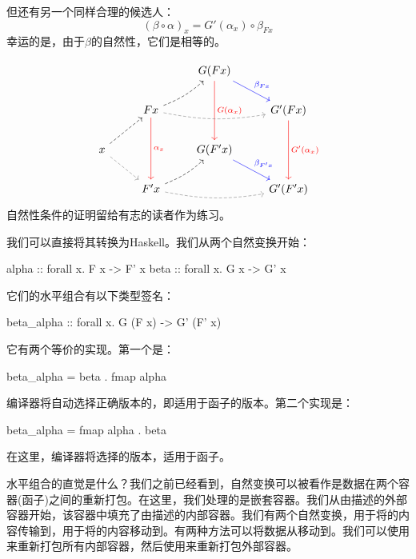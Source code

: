 \documentclass[DaoFP]{subfiles}
\begin{document}
    但还有另一个同样合理的候选人：
    \[ (\beta \circ \alpha)_x = G'(\alpha_x) \circ \beta_{F x}\]
    幸运的是，由于$\beta$的自然性，它们是相等的。

    \[
        \begin{tikzcd}
            && G(F x)
            \arrow[dd, red, "G(\alpha_x)"]
            \arrow[dr, blue, "\beta_{F x}"]
            \\
            & F x
            \arrow[rr, bend right=10, dashed, gray]
            \arrow[ur, bend right=10, dashed]
            \arrow[dd, red, "\alpha_x"]
            && G' (F x)
            \arrow[dd, red, "G'(\alpha_x)"]
            \\
            x
            \arrow[ur, dashed]
            \arrow[dr, gray, dashed]
            && G(F' x)
            \arrow[dr, blue, "\beta_{F' x}"]
            \\
            &F' x
            \arrow[rr, bend right=10, dashed, gray]
            \arrow[ur, bend right=10, dashed]
            && G'(F' x)
        \end{tikzcd}
    \]
    自然性条件的证明留给有志的读者作为练习。

    我们可以直接将其转换为Haskell。我们从两个自然变换开始：
    \begin{haskell}
        alpha :: forall x. F x -> F' x
        beta  :: forall x. G x -> G' x
    \end{haskell}
    它们的水平组合有以下类型签名：
    \begin{haskell}
        beta_alpha :: forall x. G (F x) -> G' (F' x)
    \end{haskell}
    它有两个等价的实现。第一个是：
    \begin{haskell}
        beta_alpha = beta . fmap alpha
    \end{haskell}
    编译器将自动选择正确版本的，即适用于函子的版本。第二个实现是：
    \begin{haskell}
        beta_alpha = fmap alpha . beta
    \end{haskell}
    在这里，编译器将选择的版本，适用于函子。

    水平组合的直觉是什么？我们之前已经看到，自然变换可以被看作是数据在两个容器(函子)之间的重新打包。在这里，我们处理的是嵌套容器。我们从由描述的外部容器开始，该容器中填充了由描述的内部容器。我们有两个自然变换，用于将的内容传输到，用于将的内容移动到。有两种方法可以将数据从移动到。我们可以使用来重新打包所有内部容器，然后使用来重新打包外部容器。
\end{document}
